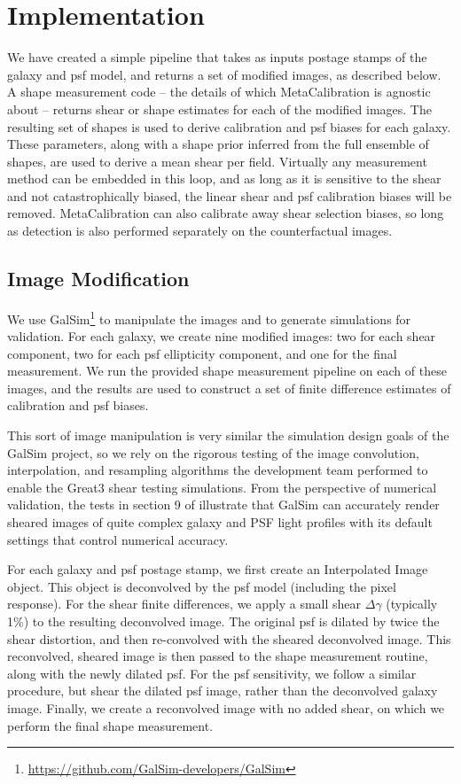 \documentclass[iop]{emulateapj}
\begin{document}
\section{Implementation}
We have created a simple pipeline that takes as inputs postage stamps
of the galaxy and psf model, and returns a set of modified images, as
described below. A shape measurement code -- the details of which
MetaCalibration is agnostic about -- returns shear or shape estimates
for each of the modified images. The resulting set of shapes is used
to derive calibration and psf biases for each galaxy. These
parameters, along with a shape prior inferred from the full ensemble
of shapes, are used to derive a mean shear per field. Virtually any
measurement method can be embedded in this loop, and as long as it is
sensitive to the shear and not catastrophically biased, the linear
shear and psf calibration biases will be removed. MetaCalibration can
also calibrate away shear selection biases, so long as detection is
also performed separately on the counterfactual images.

\subsection{Image Modification}
We use
GalSim\footnote{\url{https://github.com/GalSim-developers/GalSim}}
\citep{2015A&C....10..121R} to manipulate the images and to generate
simulations for validation. For each galaxy, we create nine modified
images: two for each shear component, two for each psf ellipticity
component, and one for the final measurement. We run the provided
shape measurement pipeline on each of these images, and the results
are used to construct a set of finite difference estimates of
calibration and psf biases.

This sort of image manipulation is very similar the simulation design
goals of the GalSim project, so we rely on the rigorous testing of the
image convolution, interpolation, and resampling algorithms the
development team performed to enable the Great3 shear testing
simulations.  From the perspective of numerical validation, the tests
in section 9 of \cite{2015A&C....10..121R} illustrate that GalSim can
accurately render sheared images of quite complex galaxy and PSF light
profiles with its default settings that control numerical accuracy.

For each galaxy and psf postage stamp, we first create an Interpolated
Image object. This object is deconvolved by the psf model (including
the pixel response). For the shear finite differences, we apply a
small shear $\Delta\gamma$ (typically 1\%) to the resulting
deconvolved image. The original psf is dilated by twice the shear
distortion, and then re-convolved with the sheared deconvolved
image. This reconvolved, sheared image is then passed to the shape
measurement routine, along with the newly dilated psf. For the psf
sensitivity, we follow a similar procedure, but shear the dilated psf
image, rather than the deconvolved galaxy image. Finally, we create a
reconvolved image with no added shear, on which we perform the
final shape measurement.
\end{document}
